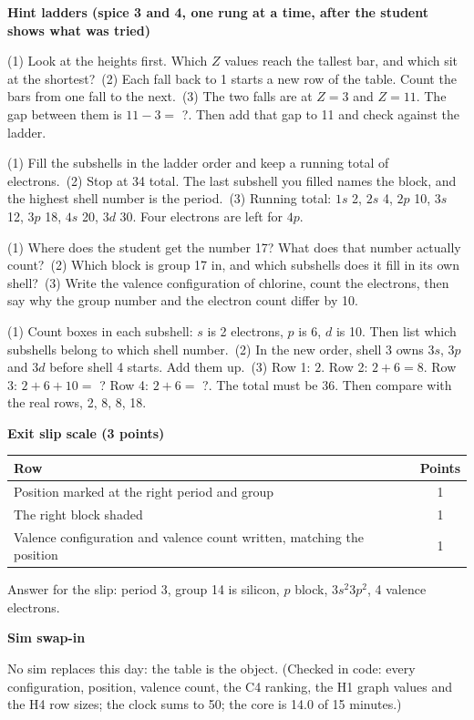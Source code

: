 \documentclass[10.5pt]{article}
\newcommand{\sect}[1]{\par\medskip\noindent\textbf{\large #1}\par\smallskip}
\theoremstyle{definition}\newtheorem*{example}{Example}\newtheorem*{method*}{Method}
\theoremstyle{remark}\newtheorem*{remark}{Remark}
\begin{document}
\sect{Hint ladders (spice 3 and 4, one rung at a time, after the student shows what was tried)}\begin{description}[leftmargin=2.2em,itemsep=2pt]

\item[H1] (1) Look at the heights first. Which $Z$ values reach the tallest bar, and which sit at the shortest?\ (2) Each fall back to 1 starts a new row of the table. Count the bars from one fall to the next.\ (3) The two falls are at $Z=3$ and $Z=11$. The gap between them is $11-3=$ ?. Then add that gap to 11 and check against the ladder.

\item[H2] (1) Fill the subshells in the ladder order and keep a running total of electrons.\ (2) Stop at 34 total. The last subshell you filled names the block, and the highest shell number is the period.\ (3) Running total: $1s$ 2, $2s$ 4, $2p$ 10, $3s$ 12, $3p$ 18, $4s$ 20, $3d$ 30. Four electrons are left for $4p$.

\item[H3] (1) Where does the student get the number 17? What does that number actually count?\ (2) Which block is group 17 in, and which subshells does it fill in its own shell?\ (3) Write the valence configuration of chlorine, count the electrons, then say why the group number and the electron count differ by 10.

\item[H4] (1) Count boxes in each subshell: $s$ is 2 electrons, $p$ is 6, $d$ is 10. Then list which subshells belong to which shell number.\ (2) In the new order, shell 3 owns $3s$, $3p$ and $3d$ before shell 4 starts. Add them up.\ (3) Row 1: $2$. Row 2: $2+6=8$. Row 3: $2+6+10=$ ? Row 4: $2+6=$ ?. The total must be 36. Then compare with the real rows, 2, 8, 8, 18.

\end{description}

\sect{Exit slip scale (3 points)}\begin{tabular}{@{}lc@{}}\toprule Row & Points\\\midrule
Position marked at the right period and group & 1\\
The right block shaded & 1\\
Valence configuration and valence count written, matching the position & 1\\\bottomrule\end{tabular}\par
Answer for the slip: period 3, group 14 is silicon, $p$ block, $3s^{2}3p^{2}$, 4 valence electrons.

\sect{Sim swap-in}No sim replaces this day: the table is the object. (Checked in code: every configuration, position, valence count, the C4 ranking, the H1 graph values and the H4 row sizes; the clock sums to 50; the core is 14.0 of 15 minutes.)

\par{}
\end{document}
